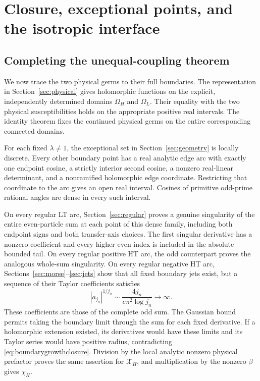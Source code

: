 \documentclass[11pt]{article}
\numberwithin{equation}{section}
\theoremstyle{definition}
\newcommand{\OH}{\Omega_H}
\newcommand{\OL}{\Omega_L}
\newcommand{\XH}{\mathcal X_H}
\begin{document}
\section{Closure, exceptional points, and the isotropic interface}\label{sec:closure}

\subsection{Completing the unequal-coupling theorem}
We now trace the two physical germs to their full boundaries. The
representation in Section~\ref{sec:physical} gives holomorphic functions
on the explicit, independently determined domains $\OH$ and $\OL$.
Their equality with the two physical susceptibilities holds on the
appropriate positive real intervals. The identity theorem fixes the
continued physical germs on the entire corresponding connected domains.

For each fixed $\lambda\ne1$, the exceptional set in
Section~\ref{sec:geometry} is locally discrete. Every other boundary
point has a real analytic edge arc with exactly one endpoint cosine,
a strictly interior second cosine, a nonzero real-linear determinant,
and a nonramified holomorphic edge coordinate. Restricting that
coordinate to the arc gives an open real interval. Cosines of primitive
odd-prime rational angles are dense in every such interval.

On every regular LT arc, Section~\ref{sec:regular} proves a genuine
singularity of the entire even-particle sum at each point of this dense
family, including both endpoint signs and both transfer-axis choices.
The first singular derivative has a nonzero coefficient and every
higher even index is included in the absolute bounded tail. On every
regular positive HT arc, the odd counterpart proves the analogous
whole-sum singularity. On every regular negative HT arc,
Sections~\ref{sec:morse}--\ref{sec:jets} show that all fixed boundary
jets exist, but a sequence of their Taylor coefficients satisfies
\begin{equation}\label{eq:boundarygrowthclosure}
 |a_{j_n}|^{1/j_n}\sim\frac{4j_n}{e\pi^2\log j_n}\longrightarrow\infty.
\end{equation}
These coefficients are those of the complete odd sum. The Gaussian
bound permits taking the boundary limit through the sum for each fixed
derivative. If a holomorphic extension existed, its derivatives would
have these limits and its Taylor series would have positive radius,
contradicting \eqref{eq:boundarygrowthclosure}. Division by the local
analytic nonzero physical prefactor proves the same assertion for
$\XH$, and multiplication by the nonzero $\beta$ gives $\chi_H$.
\end{document}
